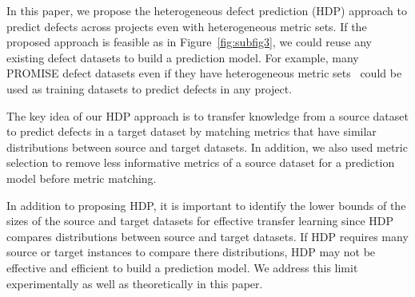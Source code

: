 
In this paper, we propose the heterogeneous defect prediction (HDP) approach
to predict defects across projects even with heterogeneous metric
sets.
If the proposed approach is feasible as in
Figure~\ref{fig:subfig3}, we could reuse any existing defect
datasets to build a prediction model. For example, many PROMISE defect datasets
even if they have heterogeneous metric sets~\cite{promise12} could be used as
training datasets to predict defects in any project.

The key idea of our HDP approach is to transfer knowledge from a source dataset to predict defects in a target dataset by matching metrics that have
similar distributions between source and target datasets. In addition, we also
used metric selection to remove less informative metrics of a source dataset
for a prediction model before metric matching.

In addition to proposing HDP, it is important to identify the lower bounds of the sizes of the source and target datasets for effective transfer learning since HDP compares distributions between source and target datasets. 
If HDP requires many source or target instances to compare there distributions, HDP may not be effective and efficient to build a prediction model. We address this limit experimentally as well as theoretically in this paper.


